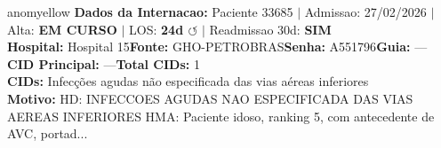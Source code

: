 \documentclass[a4paper,10pt]{article}
\begin{document}
\begin{anomalycard}[Internacao 167178 | GHO-PETROBRAS | MODERADO (z=2.51)]{anomyellow}
\textbf{Dados da Internacao:} Paciente 33685 $\mid$ Admissao: 27/02/2026 $\mid$ Alta: \textcolor{anomorange}{\textbf{EM CURSO}} $\mid$ LOS: \textbf{24d \textcolor{anomorange}{$\circlearrowleft$}} $\mid$ Readmissao 30d: \textcolor{anomred}{\textbf{SIM}}\\
\textbf{Hospital:} Hospital 15\quad\textbf{Fonte:} GHO-PETROBRAS\quad\textbf{Senha:} A551796\quad\textbf{Guia:} ---\\
\textbf{CID Principal:} {\small ---}\quad\textbf{Total CIDs:} 1\\

\textbf{CIDs:} {\scriptsize Infecções agudas não especificada das vias aéreas inferiores}\\

\textbf{Motivo:} {\scriptsize HD: INFECCOES AGUDAS NAO ESPECIFICADA DAS VIAS AEREAS INFERIORES  HMA: Paciente idoso, ranking 5, com antecedente de AVC, portad...}\\


\end{anomalycard}
\end{document}
